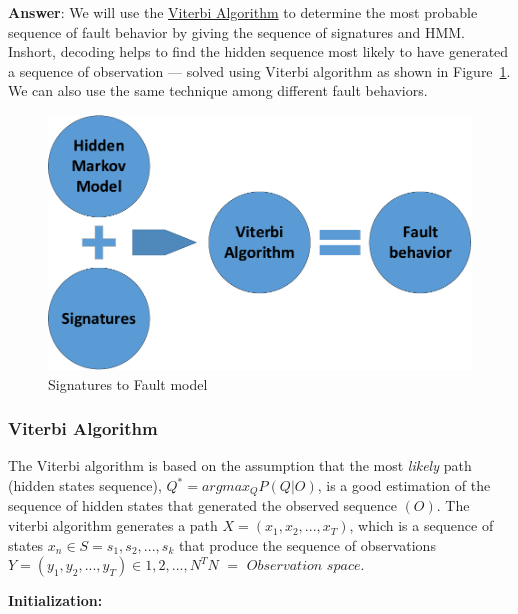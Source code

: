 \textbf{Answer}: We will use the \underline{Viterbi Algorithm} to determine the most probable sequence of fault behavior by giving the sequence of signatures and HMM. Inshort, decoding helps to find the hidden sequence most likely to have generated a sequence of observation --- solved using Viterbi algorithm as shown in Figure~\ref{fig:HMMsig-Vit}. We can also use the same technique among different fault behaviors.


\begin{figure}[tb!]

 \centering
  \captionsetup{justification=centering}    
   \includegraphics[scale=0.8]{Figures/HMM-plus-viterbi.pdf}
   \caption{Signatures to Fault model}
\label{fig:HMMsig-Vit}
\end{figure}

\subsubsection{Viterbi Algorithm}


The Viterbi algorithm is based on the assumption that the most \textit{likely} path (hidden states sequence), $Q^* = argmax_Q P(Q|O) $, is a good estimation of the sequence of hidden states that generated the observed sequence $(O)$. The viterbi algorithm generates a path $X = (x_1, x_2,...,x_T)$, which is a sequence of states $x_n \in S = {s_1, s_2,...,s_k}$ that produce the sequence of observations $Y = (y_1,y_2,...,y_T) \in {1,2,...,N}^T N$ $=$ $Observation$ $space$.

\textbf{Initialization:}



